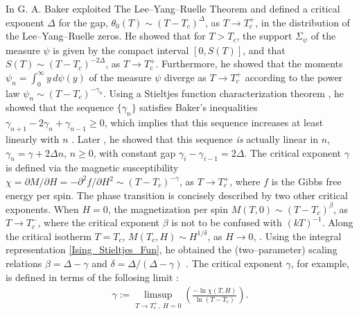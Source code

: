 \documentclass[english,12pt,jmp,graphicx]{revtex4-1}
\begin{document}
In \cite{Baker:PRB:1184,Baker-1990} G. A. Baker exploited The
Lee--Yang--Ruelle Theorem and defined a critical exponent $\Delta$ for
the gap, $\theta_0(T)\sim(T-T_c)^\Delta$, as $T\to T_c^+$, in the distribution of the
Lee--Yang--Ruelle zeros. He showed that for $T>T_c$, the support $\Sigma_\psi$
of the measure $\psi$ is given by the compact interval $[0,S(T)]$, and that
$S(T)\sim(T-T_c)^{-2\Delta}$, as $T\to T_c^+$. Furthermore, he showed that the moments
$\psi_n=\int_0^\infty y\,d\psi(y)$ of the measure $\psi$ diverge as $T\to T_c^+$ according to 
the power law $\psi_n\sim(T-T_c)^{-\gamma_n}$. Using a Stieltjes function
characterization theorem \cite{Baker-1990}, he showed that the sequence
$\{\gamma_n\}$ satisfies Baker's inequalities $\gamma_{n+1}-2\gamma_n+\gamma_{n-1}\geq0$, which
implies that this sequence increases at least linearly with $n$
\cite{Baker:PRL-990}. Later \cite{Baker-1990}, he showed that this
sequence \emph{is} actually linear in $n$, $\gamma_n=\gamma+2\Delta n$, $n\geq0$, with
constant gap $\gamma_i-\gamma_{i-1}=2\Delta$. The critical exponent $\gamma$ is defined
via the magnetic susceptibility $\chi=\partial M/\partial H=-\partial^2f/\partial H^2\sim(T-T_c)^{-\gamma}$, as
$T\to T_c^+$, where $f$ is the Gibbs free energy per spin. The phase
transition is concisely described by two other critical
exponents. When $H=0$, the magnetization per spin $M(T,0)\sim(T-T_c)^\beta$,
as $T\to T_c^-$, where the critical exponent $\beta$ is not to be confused
with $(kT)^{-1}$. Along the critical isotherm $T=T_c$, $M(T_c,H)\sim
H^{1/\delta}$, as $H\to0$, \cite{Christensen-2005,Baker-1990}. Using the integral 
representation \eqref{Ising_Stieltjes_Fun}, he obtained the
(two--parameter) scaling relations $\beta=\Delta-\gamma$ and $\delta=\Delta/(\Delta-\gamma)$
\cite{Baker-1990}. The critical exponent $\gamma$, for example, is defined
in terms of the follosing limit \cite{Baker-1990}:
% 
\begin{align}
  \gamma:=\limsup_{T\to T_c^+, \;H=0}\left(\frac{-\ln \chi(T,H)}{\ln(T-T_c)}  \right).
\end{align}
%
\end{document}
